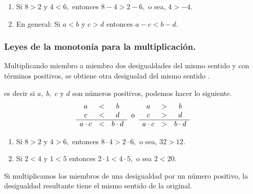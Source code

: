 \documentclass[oneside,english,spanish,2m,twoside,svgnames,x11names,HTML,twoside,12pt]{libro-matua}\usepackage[]{graphicx}\usepackage[]{color}
\begin{document}
\begin{ejemplos}
\begin{enumerate}
\item Si $8>2$ y $4<6,$ entonces $8-4>2-6,$ o sea, $4>-4.$
\item En general: Si $a<b$ y $c>d$ entonces $a-c<b-d$.
\end{enumerate}
\end{ejemplos}

\subsubsection{Leyes de la monotonía para la multiplicación. }

\vspace*{10pt}

\begin{propiedad}{}

Multiplicando miembro a miembro dos desigualdades del mismo sentido
y con términos positivos, se obtiene otra desigualad del mismo sentido
.

\end{propiedad}

es decir si $a,\;b,\;c$ y $d$ son números positivos, podemos hacer
lo siguiente. 
\[
\begin{array}{ccc}
a & < & b\\
c & < & d\\
\hline a\cdot c & < & b\cdot d
\end{array}\;\;\text{o\;\;\ensuremath{\begin{array}{ccc}
 \text{\text{\ensuremath{a}}}  &  >  &  \text{\ensuremath{b}}\\
 \text{\ensuremath{c}}  &  >  &  \text{\ensuremath{d}}\\
\hline \text{\ensuremath{a\cdot c}}  &  >  &  \text{\ensuremath{b\cdot d}} 
\end{array}}}
\]
\begin{ejemplos}
\begin{enumerate}
\item Si $8>2$ y $4>6,$ entonces $8\cdot4>2\cdot6,$ o sea, $32>12.$
\item  Si $2<4$ y $1<5$ entonces $2\cdot1<4\cdot5,$ o sea $2<20$.
\end{enumerate}
\end{ejemplos}

\begin{propiedad}{}

Si multiplicamos los miembros de una desigualdad por un número positivo,
la desigualdad resultante tiene el mismo sentido de la original.

\end{propiedad}
\end{document}
